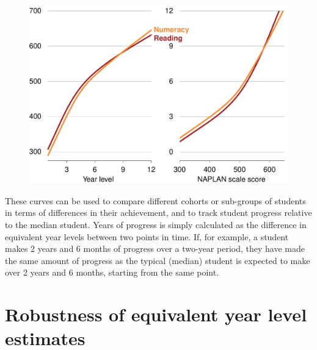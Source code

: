 \begin{figure}[H]
 \includegraphics[width=\columnwidth]{atlas/CYL_and_inverse.pdf}\label{fig:cyl_inverse}

\end{figure}
\vspace{-6pt}

\newpage
These curves can be used to compare different cohorts or sub-groups of students in terms of differences in their achievement, and to track student progress relative to the median student. Years of progress is simply calculated as the difference in equivalent year levels between two points in time. If, for example, a student makes 2 years and 6 months of progress over a two-year period, they have made the same amount of progress as the typical (median) student is expected to make over 2 years and 6 months, starting from the same point.

\newpage
\section{Robustness of equivalent year level estimates}

